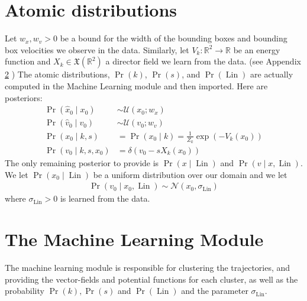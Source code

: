 \documentclass[12pt]{amsart}
\DeclareMathOperator{\Lin}{Lin}
\begin{document}
\section{Atomic distributions}
Let $w_x, w_v  > 0$ be a bound for the width of the bounding boxes and bounding box velocities we observe in the data.
Similarly, let $V_k: \mathbb{R}^2 \to \mathbb{R}$ be an energy function and $X_k \in \mathfrak{X}( \mathbb{R}^2)$ a director field we learn from the data. (see Appendix \ref{app:learning} )
The atomic distributions, $\Pr(k)$, $\Pr(s)$, and $\Pr(\Lin)$ are actually computed in the Machine Learning module and then imported.
Here are posteriors:
\begin{align*}
	\Pr( \hat{x}_0 \mid x_0 ) &\sim \mathcal{U}( x_0 ; w_x ) \\
	\Pr( \hat{v}_0 \mid v_0 ) &\sim \mathcal{U}( v_0 ; w_v ) \\
	\Pr( x_0 \mid k,s ) &= \Pr(x_0 \mid k) = \frac{1}{Z_k} \exp \left( -V_k( x_0 ) \right) \\
	\Pr( v_0 \mid k,s,x_0) &= \delta( v_0 - s X_k(x_0) )
\end{align*}
The only remaining posterior to provide is $\Pr( x \mid \Lin )$ and $\Pr( v \mid x,\Lin )$.
We let $\Pr( x_0 \mid \Lin)$ be a uniform distribution over our domain and we let
\begin{align}
	\Pr( v_0 \mid x_0 , \Lin ) \sim \mathcal{N}( x_0, \sigma_{\Lin} ) \label{eq:v given x and Linear}
\end{align}
where $\sigma_{\Lin} > 0$ is learned from the data.

\section{The Machine Learning Module}
\label{app:learning}
The machine learning module is responsible for clustering the trajectories, and providing the vector-fields and potential functions for each cluster, as well as the probability $\Pr(k), \Pr(s)$ and $\Pr( \Lin)$ and the parameter $\sigma_{\Lin}$.
\end{document}
